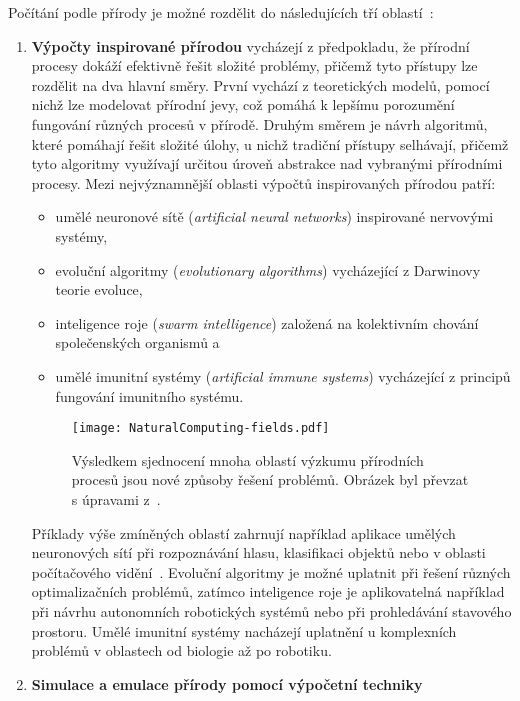Počítání podle přírody je možné rozdělit do následujících tří oblastí~\cite{FundamentalNatural}:
\begin{enumerate}
    \item \textbf{Výpočty inspirované přírodou}
        vycházejí z předpokladu, že přírodní procesy dokáží efektivně řešit složité problémy, přičemž tyto přístupy lze rozdělit na dva hlavní směry. 
        První vychází z teoretických modelů, pomocí nichž lze modelovat přírodní jevy, což pomáhá k lepšímu porozumění fungování různých procesů v přírodě. 
        Druhým směrem je návrh algoritmů, které pomáhají řešit složité úlohy, u nichž tradiční přístupy selhávají, přičemž tyto algoritmy využívají určitou úroveň abstrakce nad vybranými přírodními procesy.
        Mezi nejvýznamnější oblasti výpočtů inspirovaných přírodou patří:
        \begin{itemize}
            \item umělé neuronové sítě (\emph{artificial neural networks}) inspirované nervovými systémy,
            \item evoluční algoritmy (\emph{evolutionary algorithms}) vycházející z Darwinovy teorie evoluce,
            \item inteligence roje (\emph{swarm intelligence}) založená na kolektivním chování společenských organismů a
            \item umělé imunitní systémy (\emph{artificial immune systems}) vycházející z principů fungování imunitního systému.
        \end{itemize}
        \begin{figure}[ht!]
            \centering
            \texttt{[image: NaturalComputing-fields.pdf]}
            \caption{Výsledkem sjednocení mnoha oblastí výzkumu přírodních procesů jsou nové způsoby řešení problémů. Obrázek byl převzat s úpravami z~\cite{FundamentalNatural}.}
            \label{fig:natural-computing-fields}
        \end{figure}
        Příklady výše zmíněných oblastí zahrnují například aplikace umělých neuronových sítí při rozpoznávání hlasu, klasifikaci objektů nebo v oblasti počítačového vidění~\cite{ANN-review,ANN-survey}. 
        Evoluční algoritmy je možné uplatnit při řešení různých optimalizačních problémů, zatímco inteligence roje je aplikovatelná například při návrhu autonomních robotických systémů nebo při prohledávání stavového prostoru. 
        Umělé imunitní systémy nacházejí uplatnění u komplexních problémů v oblastech od biologie až po robotiku. 
    \item \textbf{Simulace a emulace přírody pomocí výpočetní techniky}

\end{enumerate}
